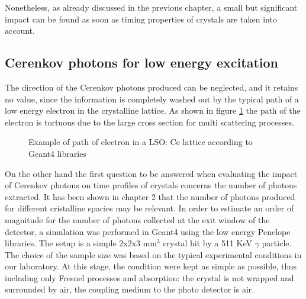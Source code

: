 Nonetheless, as already discussed in the previous chapter, a small but significant impact can be found as soon as timing properties of crystals are taken into account.
\subsection{Cerenkov photons for low energy excitation}
The direction of the Cerenkov photons produced can be neglected, and it retains no value, since the information is completely washed out by the typical path of a low energy electron in the crystalline lattice.
As shown in figure \ref{fig:electron} the path of the electron is tortuous due to the large cross section for multi scattering processes.
\begin{figure}[htbp]
\begin{center}
\end{center}
\caption[Electron path in lattice]{Example of path of electron in a LSO: Ce lattice according to Geant4 libraries}
\label{fig:electron}
\end{figure}

On the other hand the first question to be answered when evaluating the impact of Cerenkov photons on time profiles of crystals concerns the number of photons extracted.
It has been shown in chapter 2 that the number of photons produced for different cristalline spacies may be relevant. 
In order to estimate an order of magnitude for the number of photons collected at the exit window of the detector, a simulation was performed in Geant4 using the low energy Penelope libraries. The setup is a simple 2x2x3 mm$^{3}$ crystal hit by a 511 KeV $\gamma$ particle. The choice of the sample size was based on the typical experimental conditions in our laboratory. At this stage, the condition were kept as simple as possible, thus including only Fresnel processes and absorption: the crystal is not wrapped and surrounded by air, the coupling medium to the photo detector is air.

